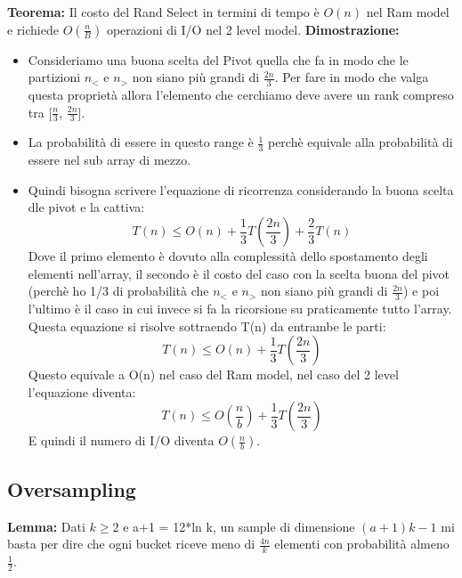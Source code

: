 \documentclass[12pt]{article}
\begin{document}
\textbf{Teorema:} Il costo del Rand Select in termini di tempo è $O(n)$ nel Ram model e richiede $O(\frac{n}{B})$ operazioni di I/O nel 2 level model.
\textbf{Dimostrazione:}
    \begin{itemize}
        \item Consideriamo una buona scelta del Pivot quella che fa in modo che le partizioni $n_<$ e $n_>$ non siano più grandi di $\frac{2n}{3}$. Per fare in modo che valga questa proprietà allora l'elemento che cerchiamo deve avere un rank compreso tra [$\frac{n}{3}$, $\frac{2n}{3}$].
        \item La probabilità di essere in questo range è $\frac{1}{3}$ perchè equivale alla probabilità di essere nel sub array di mezzo.
        \item Quindi bisogna scrivere l'equazione di ricorrenza considerando la buona scelta dle pivot e la cattiva:
        \begin{equation}
            T(n) \leq O(n) + \frac{1}{3}T(\frac{2n}{3}) + \frac{2}{3}T(n)
        \end{equation}
        Dove il primo elemento è dovuto alla complessità dello spostamento degli elementi nell'array, il secondo è il costo del caso con la scelta buona del pivot (perchè ho 1/3 di probabilità che $n_<$ e $n_>$ non siano più grandi di $\frac{2n}{3}$) e poi l'ultimo è il caso in cui invece si fa la ricorsione su praticamente tutto l'array.
        Questa equazione si risolve sottraendo T(n) da entrambe le parti:
        \begin{equation}
            T(n) \leq O(n) + \frac{1}{3}T(\frac{2n}{3})
        \end{equation}
        Questo equivale a O(n) nel caso del Ram model, nel caso del 2 level l'equazione diventa:
        \begin{equation}
            T(n) \leq O(\frac{n}{b}) + \frac{1}{3}T(\frac{2n}{3})
        \end{equation}
        E quindi il numero di I/O diventa $O(\frac{n}{b})$.
    \end{itemize}


\subsection{Oversampling}

\textbf{Lemma:} Dati $k \geq 2$ e a+1 = 12*ln k, un sample di dimensione $(a+1)k-1$ mi basta per dire che ogni bucket riceve meno di $\frac{4n}{k}$ elementi con probabilità almeno $\frac{1}{2}$.
\end{document}
